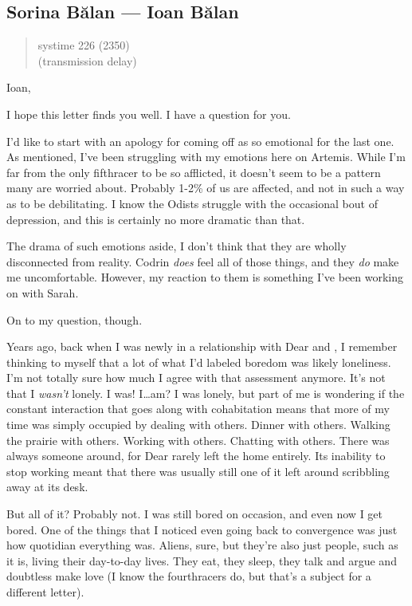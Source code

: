 \hypertarget{sorina-bux103lan-ioan-bux103lan}{%
\subsection{Sorina Bălan — Ioan Bălan}\label{sorina-bux103lan-ioan-bux103lan}}

\begin{quote}
systime 226 (2350)\\
(transmission delay)
\end{quote}

Ioan,

I hope this letter finds you well. I have a question for you.

I'd like to start with an apology for coming off as so emotional for the last one. As mentioned, I've been struggling with my emotions here on Artemis. While I'm far from the only fifthracer to be so afflicted, it doesn't seem to be a pattern many are worried about. Probably 1-2\% of us are affected, and not in such a way as to be debilitating. I know the Odists struggle with the occasional bout of depression, and this is certainly no more dramatic than that.

The drama of such emotions aside, I don't think that they are wholly disconnected from reality. Codrin \emph{does} feel all of those things, and they \emph{do} make me uncomfortable. However, my reaction to them is something I've been working on with Sarah.

On to my question, though.

Years ago, back when I was newly in a relationship with Dear and \Partner , I remember thinking to myself that a lot of what I'd labeled boredom was likely loneliness. I'm not totally sure how much I agree with that assessment anymore. It's not that I \emph{wasn't} lonely. I was! I\ldots am? I was lonely, but part of me is wondering if the constant interaction that goes along with cohabitation means that more of my time was simply occupied by dealing with others. Dinner with others. Walking the prairie with others. Working with others. Chatting with others. There was always someone around, for Dear rarely left the home entirely. Its inability to stop working meant that there was usually still one of it left around scribbling away at its desk.

But all of it? Probably not. I was still bored on occasion, and even now I get bored. One of the things that I noticed even going back to convergence was just how quotidian everything was. Aliens, sure, but they're also just people, such as it is, living their day-to-day lives. They eat, they sleep, they talk and argue and doubtless make love (I know the fourthracers do, but that's a subject for a different letter).

